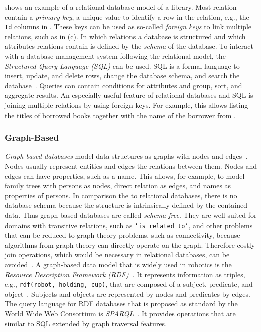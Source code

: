  shows an example of a relational
database model of a library. Most relation contain a \emph{primary
  key}, a unique value to identify a row in the relation, e.g., the
\texttt{Id} columns in . These keys
can be used as so-called \emph{foreign keys} to
link multiple relations, such as in
(c). In which relations a database is
structured and which attributes relations contain is defined by the
\emph{schema} of the database. To interact with a database management
system following the relational model, the \emph{Structured Query
  Language (SQL)} can be used. SQL is a formal language to insert,
update, and delete rows, change the database schema, and search the
database~\cite{database-def}. Queries can contain conditions for
attributes and group, sort, and aggregate results. An especially useful
feature of relational databases and SQL is joining multiple relations
by using foreign keys. For example, this allows listing the titles of
borrowed books together with the name of the borrower from
.

\subsubsection{Graph-Based}
\label{sec:graph-design}
\emph{Graph-based databases} model data structures as graphs with nodes and
edges~\cite{graphdbs}. Nodes usually represent entities and edges the
relations between them. Nodes and edges can have properties, such as a
name. This allows, for example, to model family trees with persons as
nodes, direct relation as edges, and names as properties of persons. In
comparison the to relational databases, there is no database schema
because the structure is intrinsically defined by the contained
data. Thus graph-based databases are called \emph{schema-free}. They
are well suited for domains with transitive relations, such as \texttt{'is
related to'}, and other problems that can be reduced to graph theory
problems, such as connectivity, because algorithms from graph theory
can directly operate on the graph. Therefore costly join operations, which
would be necessary in relational databases, can be
avoided~\cite{graphcomparison}. A graph-based data model that is
widely used in robotics is the \emph{Resource Description Framework
  (RDF)}~\cite{KnowRob-Representation,Oro,OpenEASE}. It represents
information as triples, e.g., \texttt{rdf(robot, holding, cup)}, that are
composed of a subject, predicate, and object~\cite{rdf}. Subjects and
objects are represented by nodes and predicates by edges. The query
language for RDF databases that is proposed as standard by the World
Wide Web Consortium is \emph{SPARQL}~\cite{sparql}. It provides operations that are
similar to SQL extended by graph traversal features.

